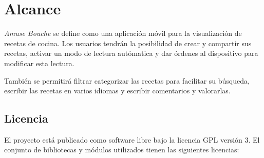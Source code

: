 \section{Alcance}

\textit{Amuse Bouche} se define como una aplicación móvil para la visualización
de recetas de cocina. Los usuarios tendrán la posibilidad de crear y compartir
sus recetas, activar un modo de lectura autómatica y dar órdenes al dispositivo
para modificar esta lectura.

También se permitirá filtrar categorizar las recetas para facilitar su búsqueda,
escribir las recetas en varios idiomas y escribir comentarios y valorarlas.


\subsection{Licencia}
El proyecto está publicado como software libre bajo la licencia
\ac{GPL} versión 3. El conjunto de bibliotecas y módulos utilizados
tienen las siguientes licencias:

